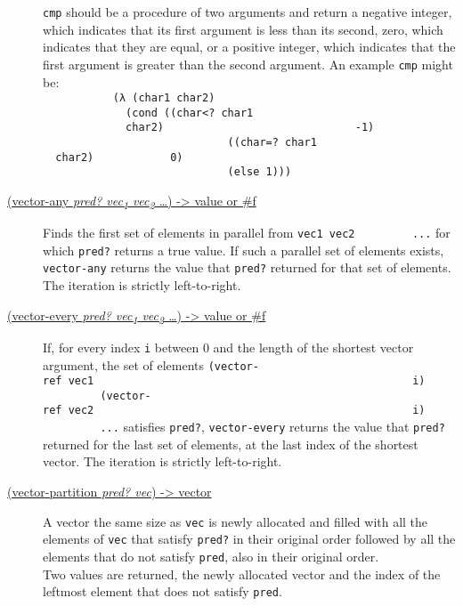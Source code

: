 \begin{description}
\texttt{cmp} should be a procedure of two arguments and return a
negative integer, which indicates that its first argument is less than
its second, zero, which indicates that they are equal, or a positive
integer, which indicates that the first argument is greater than the
second argument. An example \texttt{cmp} might
be:\\[2\baselineskip]\texttt{\ \ \ \ \ \ \ \ \ \ \ (λ\ (char1\ char2)\ \ \ \ \ \ \ \ \ }\\
\texttt{\ \ \ \ \ \ \ \ \ \ \ ~~(cond\ ((char\textless{}?\ char1\ \ \ \ \ \ \ \ \ \ \ \ \ \ \ \ \ \ \ \ \ \ \ \ \ \ \ \ \ \ \ \ \ \ \ \ \ \ \ \ \ \ \ \ char2)\ \ \ \ \ \ \ \ \ \ \ \ \ \ \ \ \ \ \ \ \ \ \ \ \ \ \ \ \ \ -1)\ \ \ \ \ \ \ \ \ }\\
\texttt{\ \ \ \ \ \ \ \ \ \ \ ~~~~~~~\ \ \ \ \ \ \ \ \ \ \ ((char=?\ char1\ \ \ \ \ \ \ \ \ \ \ \ \ \ \ \ \ \ \ \ \ \ \ char2)\ \ \ \ \ \ \ \ \ \ \ \ 0)\ \ \ \ \ \ \ \ \ }\\
\texttt{\ \ \ \ \ \ \ \ \ \ \ ~~~~~~~\ \ \ \ \ \ \ \ \ \ \ (else\ 1)))\ \ \ \ \ \ \ \ \ }\\[2\baselineskip]
\item[ \href{}{(vector-any \emph{pred? vec\textsubscript{1}
vec\textsubscript{2} \ldots{}}) -\textgreater{} value or \#f} ]
Finds the first set of elements in parallel from
\texttt{vec1\ vec2\ \ \ \ \ \ \ \ \ ...} for which \texttt{pred?}
returns a true value. If such a parallel set of elements exists,
\texttt{vector-any} returns the value that \texttt{pred?} returned for
that set of elements. The iteration is strictly
left-to-right.\\[2\baselineskip]
\item[ \href{}{(vector-every \emph{pred? vec\textsubscript{1}
vec\textsubscript{2} \ldots{}}) -\textgreater{} value or \#f} ]
If, for every index \texttt{i} between 0 and the length of the shortest
vector argument, the set of elements
\texttt{(vector-ref\ vec1\ \ \ \ \ \ \ \ \ \ \ \ \ \ \ \ \ \ \ \ \ \ \ \ \ \ \ \ \ \ \ \ \ \ \ \ \ \ \ \ \ \ \ \ \ \ \ \ \ \ i)\ \ \ \ \ \ \ \ \ \ \ \ \ (vector-ref\ vec2\ \ \ \ \ \ \ \ \ \ \ \ \ \ \ \ \ \ \ \ \ \ \ \ \ \ \ \ \ \ \ \ \ \ \ \ \ \ \ \ \ \ \ \ \ \ \ \ \ \ i)\ \ \ \ \ \ \ \ \ \ \ \ \ ...}
satisfies \texttt{pred?}, \texttt{vector-every} returns the value that
\texttt{pred?} returned for the last set of elements, at the last index
of the shortest vector. The iteration is strictly
left-to-right.\\[2\baselineskip]
\item[ \href{}{(vector-partition \emph{pred? vec}) -\textgreater{}
vector} ]
A vector the same size as \texttt{vec} is newly allocated and filled
with all the elements of \texttt{vec} that satisfy \texttt{pred?} in
their original order followed by all the elements that do not satisfy
\texttt{pred}, also in their original order.\\[2\baselineskip]Two values
are returned, the newly allocated vector and the index of the leftmost
element that does not satisfy \texttt{pred}.\\[2\baselineskip]
\end{description}

